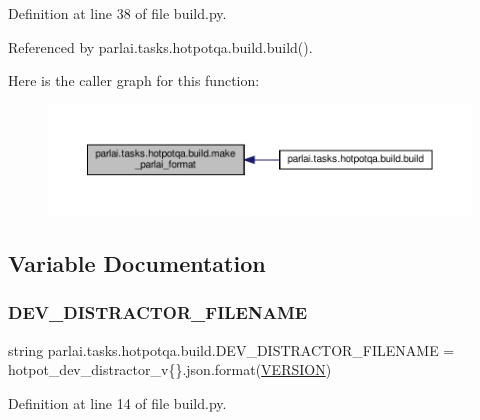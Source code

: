 Definition at line 38 of file build.\+py.



Referenced by parlai.\+tasks.\+hotpotqa.\+build.\+build().

Here is the caller graph for this function\+:
\nopagebreak
\begin{figure}[H]
\begin{center}
\leavevmode
\includegraphics[width=350pt]{namespaceparlai_1_1tasks_1_1hotpotqa_1_1build_a11cd6bdcce0c267fa7bebb496d930b44_icgraph}
\end{center}
\end{figure}


\subsection{Variable Documentation}
\mbox{\label{namespaceparlai_1_1tasks_1_1hotpotqa_1_1build_a86adac1f9e9da2911e21beaafefc2cee}} 
\subsubsection{\texorpdfstring{D\+E\+V\+\_\+\+D\+I\+S\+T\+R\+A\+C\+T\+O\+R\+\_\+\+F\+I\+L\+E\+N\+A\+ME}{DEV\_DISTRACTOR\_FILENAME}}
{\footnotesize\ttfamily string parlai.\+tasks.\+hotpotqa.\+build.\+D\+E\+V\+\_\+\+D\+I\+S\+T\+R\+A\+C\+T\+O\+R\+\_\+\+F\+I\+L\+E\+N\+A\+ME = \textquotesingle{}hotpot\+\_\+dev\+\_\+distractor\+\_\+v\{\}.json\textquotesingle{}.format(\hyperlink{namespaceparlai_1_1tasks_1_1hotpotqa_1_1build_a57a5627d2111821eb32c42f113773b1a}{V\+E\+R\+S\+I\+ON})}



Definition at line 14 of file build.\+py.

